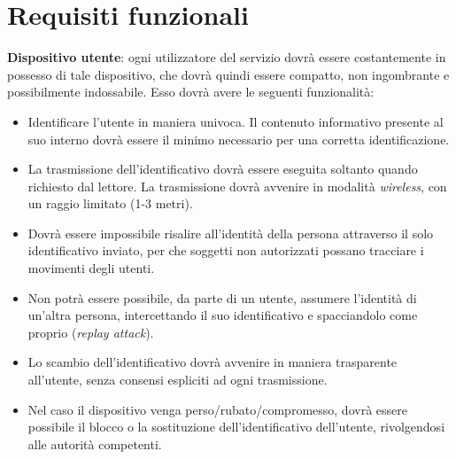 \documentclass[a4paper,12pt]{report}
\begin{document}
\section{Requisiti funzionali}
\begin{description}
	\item \textbf{Dispositivo utente}: ogni utilizzatore del servizio dovrà essere costantemente in possesso di tale dispositivo, che dovrà quindi essere compatto, non ingombrante e possibilmente indossabile. Esso dovrà avere le seguenti funzionalità: 
	\begin{itemize}
		\item  Identificare l'utente in maniera univoca. Il contenuto informativo presente al suo interno dovrà essere il minimo necessario per una corretta identificazione. 
		\item La trasmissione dell'identificativo dovrà essere eseguita soltanto quando richiesto dal lettore. La trasmissione dovrà avvenire in modalità \emph{wireless}, con un raggio limitato (1-3 metri).
		\item Dovrà essere impossibile risalire all'identità della persona attraverso il solo identificativo inviato, per che soggetti non autorizzati possano tracciare i movimenti degli utenti. 
		\item Non potrà essere possibile, da parte di un utente, assumere l'identità di un'altra persona, intercettando il suo identificativo e spacciandolo come proprio (\emph{replay attack}).
		\item Lo scambio dell'identificativo dovrà avvenire in maniera trasparente all'utente, senza consensi espliciti ad ogni trasmissione.
		\item Nel caso il dispositivo venga perso/rubato/compromesso, dovrà essere possibile il blocco o la sostituzione dell'identificativo dell'utente, rivolgendosi alle autorità competenti. 
	\end{itemize}


\end{description}
\end{document}
